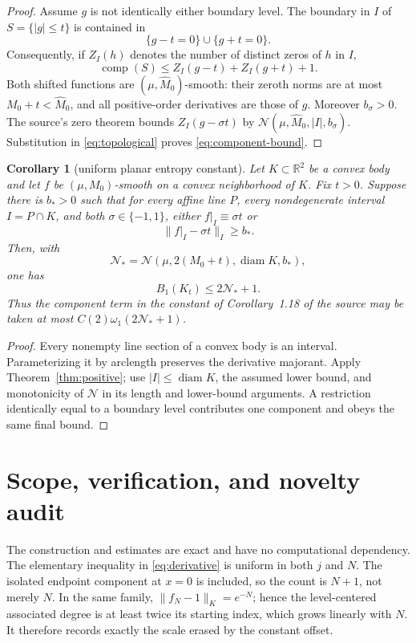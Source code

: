 \documentclass[11pt]{article}
\newtheorem{corollary}{Corollary}
\newcommand{\R}{\mathbb R}
\newcommand{\comp}{\operatorname{comp}}
\newcommand{\diam}{\operatorname{diam}}
\begin{document}
\begin{proof}
Assume $g$ is not identically either boundary level.  The boundary in $I$ of
$S=\{|g|\le t\}$ is contained in
\[
                  \{g-t=0\}\cup\{g+t=0\}.
\]
Consequently, if $Z_I(h)$ denotes the number of distinct zeros of $h$ in $I$,
\begin{equation}\label{eq:topological}
                       \comp(S)\le Z_I(g-t)+Z_I(g+t)+1.
\end{equation}
Both shifted functions are $(\mu,\widehat M_0)$-smooth: their zeroth norms
are at most $M_0+t<\widehat M_0$, and all positive-order derivatives are
those of $g$.  Moreover $b_\sigma>0$.  The source's zero theorem bounds
$Z_I(g-\sigma t)$ by
$\mathcal N(\mu,\widehat M_0,|I|,b_\sigma)$.  Substitution in
\eqref{eq:topological} proves \eqref{eq:component-bound}.
\end{proof}

\begin{corollary}[uniform planar entropy constant]\label{cor:plane}
Let $K\subset\R^2$ be a convex body and let $f$ be
$(\mu,M_0)$-smooth on a convex neighborhood of $K$.  Fix $t>0$.  Suppose
there is $b_*>0$ such that for every affine line $P$, every nondegenerate
interval $I=P\cap K$, and both $\sigma\in\{-1,1\}$, either
$f|_I\equiv\sigma t$ or
\[
                         \|f|_I-\sigma t\|_I\ge b_*.
\]
Then, with
\[
 \mathcal N_*=
 \mathcal N(\mu,2(M_0+t),\diam K,b_*),
\]
one has
\[
                 B_1(K_t)\le2\mathcal N_*+1.
\]
Thus the component term in the constant of Corollary~1.18 of the source may
be taken at most $C(2)\omega_1(2\mathcal N_*+1)$.
\end{corollary}

\begin{proof}
Every nonempty line section of a convex body is an interval.  Parameterizing
it by arclength preserves the derivative majorant.  Apply
Theorem~\ref{thm:positive}; use $|I|\le\diam K$, the assumed lower bound, and
monotonicity of $\mathcal N$ in its length and lower-bound arguments.  A
restriction identically equal to a boundary level contributes one component
and obeys the same final bound.
\end{proof}

\section{Scope, verification, and novelty audit}

The construction and estimates are exact and have no computational
dependency.  The elementary inequality in \eqref{eq:derivative} is uniform in
both $j$ and $N$.  The isolated endpoint component at $x=0$ is included, so
the count is $N+1$, not merely $N$.  In the same family,
$\|f_N-1\|_K=e^{-N}$; hence the level-centered associated degree is at least
twice its starting index, which grows linearly with $N$.  It therefore records
exactly the scale erased by the constant offset.
\end{document}
